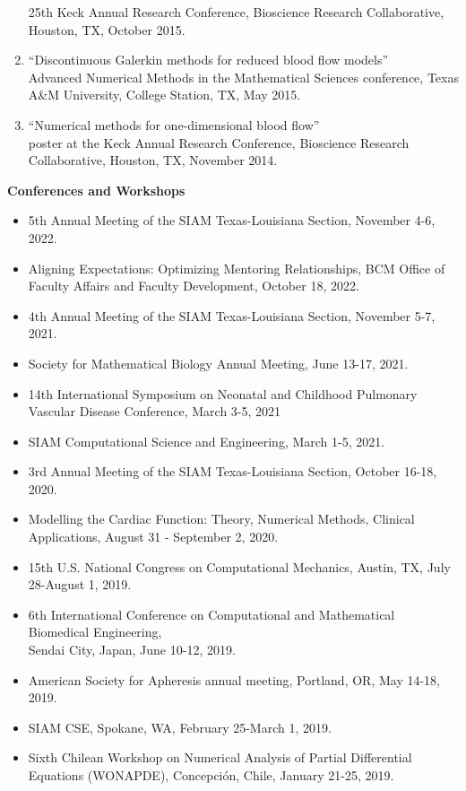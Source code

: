 \documentclass{article} %
\begin{document}
\begin{enumerate}
25th Keck Annual Research Conference, Bioscience Research Collaborative, Houston, TX,  October 2015.
\item ``Discontinuous Galerkin methods for reduced blood flow models'' \\
Advanced Numerical Methods in the Mathematical Sciences conference, Texas A\&M University, College Station, TX, May 2015.
\item ``Numerical methods for one-dimensional blood flow'' \\
poster at the Keck Annual Research Conference, Bioscience Research Collaborative, Houston, TX, November 2014. 
\end{enumerate}

\vspace{0.5cm}
\noindent
{\bf \large Conferences and Workshops}
\begin{itemize}
\item 5th Annual Meeting of the SIAM Texas-Louisiana Section, November 4-6, 2022.
\item Aligning Expectations: Optimizing Mentoring Relationships, BCM Office of Faculty Affairs and Faculty Development, October 18, 2022.
\item 4th Annual Meeting of the SIAM Texas-Louisiana Section, November 5-7, 2021. 
\item Society for Mathematical Biology Annual Meeting, June 13-17, 2021.
\item 14th International Symposium on Neonatal and Childhood Pulmonary Vascular Disease Conference, March 3-5, 2021
\item SIAM Computational Science and Engineering, March 1-5, 2021.
\item 3rd Annual Meeting of the SIAM Texas-Louisiana Section, October 16-18, 2020. 
\item Modelling the Cardiac Function: Theory, Numerical Methods, Clinical Applications, August 31 - September 2, 2020.
\item 15th U.S. National Congress on Computational Mechanics, Austin, TX, July 28-August 1, 2019.
\item 6th International Conference on Computational and Mathematical Biomedical Engineering,\\ Sendai City, Japan, June 10-12, 2019.
\item American Society for Apheresis annual meeting, Portland, OR, May 14-18, 2019.
\item SIAM CSE, Spokane, WA, February 25-March 1, 2019.
\item Sixth Chilean Workshop on Numerical Analysis of Partial Differential Equations (WONAPDE), Concepci\'on, Chile, January 21-25, 2019.

\end{itemize}
\end{document}
